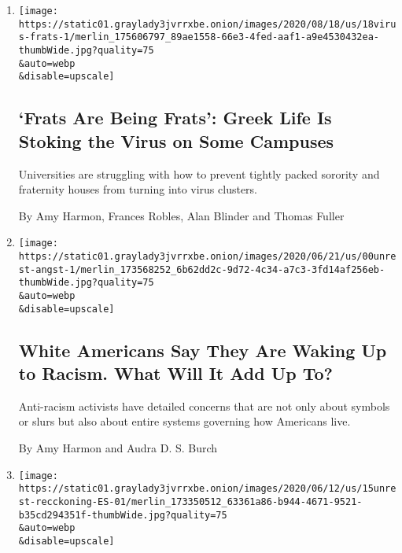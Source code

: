 \begin{enumerate}
\def\labelenumi{\arabic{enumi}.}
\item
  \href{/2020/08/18/us/coronavirus-fraternities-sororities.html}{}

  \texttt{[image: https://static01.graylady3jvrrxbe.onion/images/2020/08/18/us/18virus-frats-1/merlin\_175606797\_89ae1558-66e3-4fed-aaf1-a9e4530432ea-thumbWide.jpg?quality=75\\\&auto=webp\\\&disable=upscale]}

  \hypertarget{frats-are-being-frats-greek-life-is-stoking-the-virus-on-some-campuses}{%
  \subsection{`Frats Are Being Frats': Greek Life Is Stoking the Virus
  on Some
  Campuses}\label{frats-are-being-frats-greek-life-is-stoking-the-virus-on-some-campuses}}

  Universities are struggling with how to prevent tightly packed
  sorority and fraternity houses from turning into virus clusters.

  By Amy Harmon, Frances Robles, Alan Blinder and Thomas Fuller
\item
  \href{/2020/06/22/us/racism-white-americans.html}{}

  \texttt{[image: https://static01.graylady3jvrrxbe.onion/images/2020/06/21/us/00unrest-angst-1/merlin\_173568252\_6b62dd2c-9d72-4c34-a7c3-3fd14af256eb-thumbWide.jpg?quality=75\\\&auto=webp\\\&disable=upscale]}

  \hypertarget{white-americans-say-they-are-waking-up-to-racism-what-will-it-add-up-to}{%
  \subsection{White Americans Say They Are Waking Up to Racism. What
  Will It Add Up
  To?}\label{white-americans-say-they-are-waking-up-to-racism-what-will-it-add-up-to}}

  Anti-racism activists have detailed concerns that are not only about
  symbols or slurs but also about entire systems governing how Americans
  live.

  By Amy Harmon and Audra D. S. Burch
\item
  \href{/es/2020/06/15/espanol/mundo/racismo-george-floyd-protestas.html}{}

  \texttt{[image: https://static01.graylady3jvrrxbe.onion/images/2020/06/12/us/15unrest-recckoning-ES-01/merlin\_173350512\_63361a86-b944-4671-9521-b35cd294351f-thumbWide.jpg?quality=75\\\&auto=webp\\\&disable=upscale]}


\end{enumerate}
